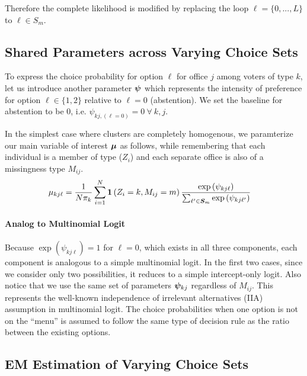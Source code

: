 \documentclass[11pt]{article}
\begin{document}
Therefore the complete likelihood is modified by replacing the loop \(\ell = \{0, ..., L\}\) to \(\ell \in S_m\).


\subsection{Shared Parameters across Varying Choice Sets}


To express the choice probability for option \(\ell\) for office \(j\) among voters of type \(k\), let us introduce another parameter \(\bm{\psi}\) which represents the intensity of preference for option \(\ell \in \{1, 2\}\) relative to \(\ell = 0\) (abstention). We set the baseline for abstention to be 0, i.e. \(\psi_{kj,(\ell=0)} = 0 ~\forall~ k, j\).

In the simplest case where clusters are completely homogenous, we paramterize our main variable of interest \(\bm{\mu}\) as follows, while remembering that each individual is a member of type (\(Z_i\)) and each separate office is also of a missingness type \(M_{ij}\).
\begin{align}
\mu_{kj\ell} &= \frac{1}{N\pi_k}\sum^N_{i = 1}\bm{1}\left(Z_i = k, M_{ij}= m\right)\frac{\exp{(\psi_{kj\ell})}}{\sum_{\ell^\prime \in \bm{S}_{m}}\exp{(\psi_{kj\ell^\prime})}}\label{eq:missing}
\end{align}

\paragraph{Analog to Multinomial Logit} Because \(\exp(\psi_{kj\ell}) = 1\) for \(\ell = 0\), which exists in all three components, each component is analogous to a simple multinomial logit. In the first two cases, since we consider only two possibilities, it reduces to a simple intercept-only logit. Also notice that we use the same set of parameters \(\bm{\psi}_{kj}\) regardless of \(M_{ij}\). This represents the well-known independence of irrelevant alternatives (IIA) assumption in multinomial logit. The choice probabilities when one option is not on the ``menu'' is assumed to follow the same type of decision rule as the ratio between the existing options.

\subsection{EM Estimation of Varying Choice Sets}
\end{document}
